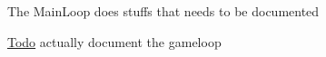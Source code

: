 The MainLoop does stuffs that needs to be documented \begin{Desc}
\item[\hyperlink{todo__todo000003}{Todo}]actually document the gameloop \end{Desc}
